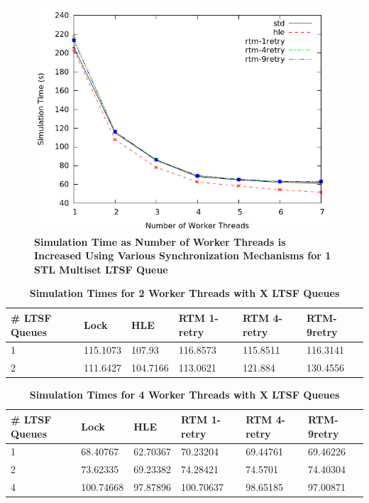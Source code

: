 \documentclass[a4paper]{article}
\begin{document}
\begin{figure}[H]
    \centering
    \graphicspath{ {./figures/} }
    \includegraphics[width=\textwidth,height=\textheight,keepaspectratio]{noThrMig-summary-multiset-hugeepidemicsim-timeVSthreads-1schQ}
    \caption{\textbf{Simulation Time as Number of Worker Threads is Increased
    Using Various Synchronization Mechanisms for 1 STL Multiset LTSF Queue}}
    \label{fig:noThrMig_timeVSthreads_1schq}
\end{figure}

\begin{table}[H]
    \centering
    \begin{tabular}{l|p{2cm}|p{2cm}|p{2cm}|p{2cm}|p{2cm}}
        \textbf{\# LTSF Queues}&Lock &HLE &RTM 1-retry &RTM 4-retry &RTM-9retry \\
        \hline
        \midrule
            1 &115.1073 &107.93   &116.8573 &115.8511 &116.3141 \\ 
            2 &111.6427 &104.7166 &113.0621 &121.884  &130.4556   
    \end{tabular}
    \caption{\textbf{Simulation Times for 2 Worker Threads with X LTSF Queues}}
    \label{tab:noThrMig_2threadsXschq}
\end{table}

\begin{table}[H]
    \centering
    \begin{tabular}{l|p{2cm}|p{2cm}|p{2cm}|p{2cm}|p{2cm}}
        \textbf{\# LTSF Queues}&Lock &HLE &RTM 1-retry &RTM 4-retry &RTM-9retry \\
        \hline
        \midrule
            1 &68.40767  &62.70367 &70.23204  &69.44761 &69.46226 \\ 
            2 &73.62335  &69.23382 &74.28421  &74.5701  &74.40304 \\
            4 &100.74668 &97.87896 &100.70637 &98.65185 &97.00871 
    \end{tabular}
    \caption{\textbf{Simulation Times for 4 Worker Threads with X LTSF Queues}}
    \label{tab:noThrMig_6threadsXschq}
\end{table}
\end{document}
